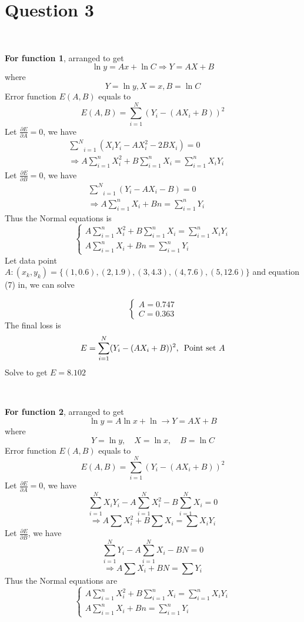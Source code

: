 \documentclass{article}
\begin{document}
{{\section*{Question 3}

\begin{answer}
  \ 
\end{answer}

\textbf{For function 1}, arranged to get
\[ \ln y = Ax + \ln C \Rightarrow Y = AX + B \]
where
\begin{equation}
  Y = \ln y, X = x, B = \ln C
\end{equation}
Error function $E (A, B)$ equals to
\[ E (A, B) = \overset{N}{\underset{i = 1}{\sum}} (Y_i - (AX_i + B))^2 \]
Let $\frac{\partial E}{\partial A} = 0$, we have
\begin{eqnarray}
  \underset{i = 1}{\overset{N}{\sum}} (X_i Y_i - AX_i^2 - 2 BX_i) = 0 &  & 
  \nonumber\\
  \Rightarrow A \sum_{i = 1}^n X_i^2 + B \sum_{i = 1}^n X_i = \sum_{i = 1}^n
  X_i Y_i &  & 
\end{eqnarray}
Let $\frac{\partial E}{\partial B} = 0$, we have
\begin{eqnarray*}
  \underset{i = 1}{\overset{N}{\sum}} (Y_i - AX_i - B) = 0 &  & \\
  \Rightarrow A \sum_{i = 1}^n X_i + Bn = \sum_{i = 1}^n Y_i &  & 
\end{eqnarray*}
Thus the Normal equations is
\[ \left\{\begin{array}{l}
     A \sum_{i = 1}^n X_i^2 + B \sum_{i = 1}^n X_i = \sum_{i = 1}^n X_i Y_i\\
     A \sum_{i = 1}^n X_i + Bn = \sum_{i = 1}^n Y_i
   \end{array}\right. \]
Let data point $A : (x_k, y_k) = \{(1, 0.6), (2, 1.9), (3, 4.3), (4, 7.6), (5,
12.6)\}$ and equation (7) in, we can solve


\[ \left\{\begin{array}{l}
     A = 0.747\\
     C = 0.363
   \end{array}\right. \]
The final loss is
\[ E = \overset{N}{\underset{i = 1}{\sum}} (Y_i - (AX_i + B))^2  \text{, \
   Point set $A$} \]
Solve to get $E = 8.102$

\

\textbf{For function 2}, arranged to get
\[ \ln y = A \ln x + \ln \rightarrow Y = AX + B \]
where
\[ Y = \ln y, \quad X = \ln x, \quad B = \ln C \]
Error function $E (A, B)$ equals to
\[ E (A, B) = \sum_{i = 1}^N (Y_i - (AX_i + B))^2 \]
Let $\frac{\partial E}{\partial A} = 0$, we have
\[ \sum_{i = 1}^N X_i Y_i - A \sum_{i = 1}^N X_i^2 - B \sum_{i = 1}^N X_i = 0
\]
\[ \Rightarrow A \sum X_i^2 + B \sum X_i = \sum X_i Y_i \]
Let $\frac{\partial E}{\partial B}$, we have
\[ \sum_{i = 1}^N Y_i - A \sum_{i = 1}^N X_i - BN = 0 \]
\[ \Rightarrow A \sum X_i + BN = \sum Y_i \]
Thus the Normal equations are
\[ \left\{\begin{array}{l}
     A \sum_{i = 1}^n X_i^2 + B \sum_{i = 1}^n X_i = \sum_{i = 1}^n X_i Y_i\\
     A \sum_{i = 1}^n X_i + Bn = \sum_{i = 1}^n Y_i
   \end{array}\right. \]


}}
\end{document}
